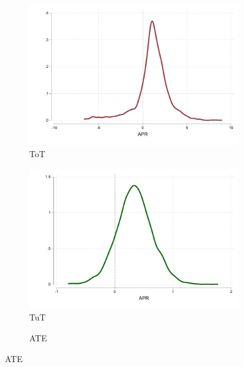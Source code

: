 \documentclass[oneside,11pt]{article}
\begin{document}
\begin{figure}[H]
     \caption{Heterogeneous Treatment Effects}
    \label{heterogeneous_effects}
    \begin{center}
     \begin{subfigure}{0.55\textwidth}
    \caption{ToT}
       \centering
      \includegraphics[width=\textwidth]{Figuras/he_dist_tau_hat_tot.pdf}
    \end{subfigure}
    \begin{subfigure}{0.55\textwidth}
    \caption{TuT}
       \centering
      \includegraphics[width=\textwidth]{Figuras/he_dist_tau_hat_tut.pdf}
    \end{subfigure} 
       \begin{subfigure}{.55\textwidth}
      \caption{ATE}
        \centering

\end{subfigure}
\end{center}
\end{figure}
\end{document}
